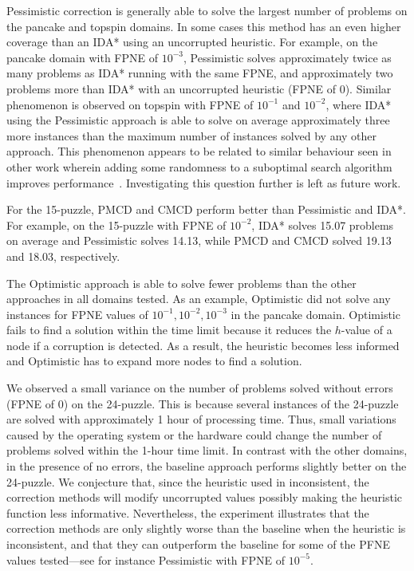 \documentclass[letterpaper]{article}
\begin{document}
Pessimistic correction is generally able to solve the largest number of problems on the pancake and topspin domains. In some cases this method has an even higher coverage than an IDA* using an uncorrupted heuristic. For example, on the pancake domain with FPNE of $10^{-3}$, Pessimistic solves approximately twice as many problems as IDA* running with the same FPNE, and approximately two problems more than IDA* with an uncorrupted heuristic (FPNE of $0$). %
Similar phenomenon is observed on topspin with FPNE of $10^{-1}$ and $10^{-2}$, where IDA* using the Pessimistic approach is able to solve on average approximately three more instances than the maximum number of instances solved by any other approach.
This phenomenon appears to be related to similar behaviour seen in other work wherein  adding some randomness to a suboptimal search algorithm improves performance~\cite{valenzano2014comparison}. Investigating this question further is left as future work.

For the 15-puzzle, PMCD and CMCD perform better than Pessimistic and IDA*. For example, on the 15-puzzle with FPNE of $10^{-2}$, IDA* solves 15.07 problems on average and Pessimistic solves 14.13, while PMCD and CMCD solved 19.13 and 18.03, respectively.

The Optimistic approach is able to solve fewer problems than the other approaches in all domains tested. As an example, Optimistic did not solve any instances for FPNE values of $10^{-1}, 10^{-2}, 10^{-3}$ in the pancake domain. Optimistic fails to find a solution within the time limit because it reduces the $h$-value of a node if a corruption is detected. As a result, the heuristic becomes less informed and Optimistic has to expand more nodes
to find a solution.

We observed a small variance on the number of problems solved without errors (FPNE of $0$) on the 24-puzzle. %
This is because several instances of the 24-puzzle are solved with approximately 1 hour of processing time. Thus, small variations caused by the operating system or the hardware could change the number of problems solved within the 1-hour time limit. In contrast with the other domains, in the presence of no errors, the baseline approach performs slightly better on the 24-puzzle. We conjecture that, since the heuristic used in inconsistent, the correction methods will modify uncorrupted values possibly making the heuristic function less informative. Nevertheless, the experiment illustrates that the correction methods are only slightly worse than the baseline when the heuristic is inconsistent, and that they can outperform the baseline for some of the PFNE values tested---see for instance Pessimistic with FPNE of $10^{-5}$.
\end{document}
